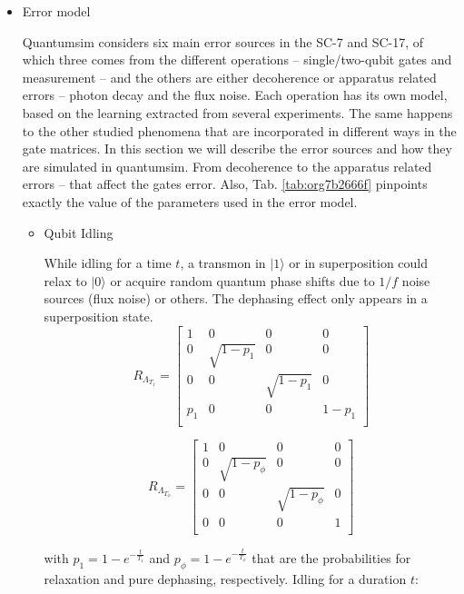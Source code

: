 \begin{itemize}
\item Error model
\label{sec:org70690a6}

Quantumsim considers six main error sources in the SC-7 and SC-17, of which three comes from the different operations -- single/two-qubit gates and measurement -- and the others are either decoherence or apparatus related errors -- photon decay and the flux noise.
Each operation has its own model, based on the learning extracted from several experiments.
The same happens to the other studied phenomena that are incorporated in different ways in the gate matrices.
In this section we will describe the error sources and how they are simulated in quantumsim.
From decoherence to the apparatus related errors -- that affect the gates error.
Also, Tab. \ref{tab:org7b2666f} pinpoints exactly the value of the parameters used in the error model.


\begin{itemize}
\item Qubit Idling
\label{sec:orgfb56b65}

While idling for a time \(t\), a transmon in \(|1\rangle\) or in superposition could relax to \(|0\rangle\) or acquire random quantum phase shifts due to \(1/f\) noise sources (flux noise) or others.
The dephasing effect only appears in a superposition state.
\begin{equation}
\label{eq:org7102db6}
R_{\Lambda_{T_1}} = \begin{bmatrix}
 1 & 0 & 0 & 0 \\
 0 & \sqrt{1 - p_1} & 0 & 0 \\
 0 & 0 & \sqrt{1 - p_1} & 0 \\
 p_1 & 0 & 0 & 1 - p_1 \\
\end{bmatrix}
\end{equation}

\begin{equation}
\label{eq:org35cd8ed}
R_{\Lambda_{T_{\phi}}} = \begin{bmatrix}
 1 & 0 & 0 & 0 \\
 0 & \sqrt{1 - p_{\phi}} & 0 & 0 \\
 0 & 0 & \sqrt{1 - p_{\phi}} & 0 \\
 0 & 0 & 0 & 1 \\
\end{bmatrix}
\end{equation}

with \(p_1 = 1 - e^{-\frac{t}{T_1}}\) and \(p_{\phi} = 1 - e^{-\frac{t}{T_{\phi}}}\) that are the probabilities for relaxation and pure dephasing, respectively.
Idling for a duration \(t\):


\end{itemize}
\end{itemize}
